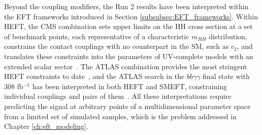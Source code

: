 

%
Beyond the coupling modifiers, the Run 2 results have been interpreted within the EFT frameworks introduced in Section \ref{subsubsec:EFT_frameworks}. Within HEFT, the CMS combination sets upper limits on the HH cross section at a set of benchmark points, each representative of a characteristic $m_{HH}$ distribution, constrains the contact couplings with no counterpart in the SM, such as $c_2$, and translates these constraints into the parameters of UV-complete models with an extended scalar sector~\cite{CMS_combination}. The ATLAS combination provides the most stringent HEFT constraints to date~\cite{ATLAS:2024ish}, and the ATLAS search in the $bb\gamma\gamma$ final state with $308$ fb$^{-1}$ has been interpreted in both HEFT and SMEFT, constraining individual couplings and pairs of them~\cite{ATLAS:2025tkn}. All these interpretations require predicting the signal at arbitrary points of a multidimensional parameter space from a limited set of simulated samples, which is the problem addressed in Chapter \ref{ch:eft_modeling}.

